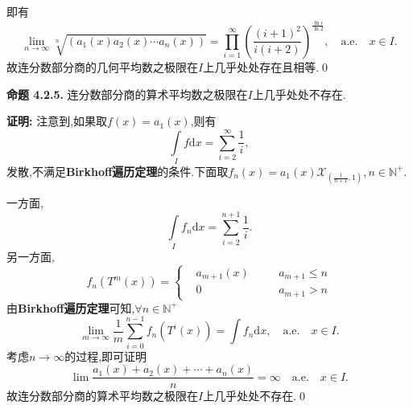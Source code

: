 即有
$$\lim\limits_{n\to\infty}\sqrt[n]{(a_1(x)a_2(x)\cdots a_n(x))}=\prod\limits_{i=1}^\infty\left(\frac{(i+1)^2}{i(i+2)}\right)^{\frac{\ln{i}}{\ln{2}}},\quad\mathrm{a.e.}\quad x\in I.$$
故连分数部分商的几何平均数之极限在$I$上几乎处处存在且相等.\qed
\par
\textbf{命题 4.2.5.  }\textsuperscript{\cite{Ergodic_theory}}
连分数部分商的算术平均数之极限在$I$上几乎处处不存在.
\par
\textbf{证明:  }
注意到,如果取$f(x)=a_1(x)$,则有
$$\int\limits_{I}f\mathrm{d}x=\sum_{i=2}^{\infty}\frac{1}{i},$$发散,不满足\textbf{Birkhoff遍历定理}的条件.下面取$f_n(x)=a_1(x)\mathcal{X}_{(\frac{1}{n+1},1)},n\in\mathbb{N^+}$.\par
一方面,
$$\int\limits_{I}f_n\mathrm{d}x=\sum_{i=2}^{n+1}\frac{1}{i}.$$
另一方面,
$$f_n(T^{m}(x))=\left\{
    \begin{aligned}
         & a_{m+1}(x) \quad &  & a_{m+1}\leqslant n \\
         & 0\quad           &  & a_{m+1}> n
    \end{aligned}
    \right
    .$$
由\textbf{Birkhoff遍历定理}可知,$\forall n\in\mathbb{N^+}$
$$\lim_{m\to\infty}\frac{1}{m}\sum\limits_{i=0}^{n-1}f_n(T^{i}(x))=\int f_n\mathrm{d}x,\quad \mathrm{a.e.}\quad x\in I.$$
考虑$n\to\infty$的过程,即可证明
$$\lim\frac{a_1(x)+a_2(x)+\cdots+a_n(x)}{n}=\infty\quad\mathrm{a.e.}\quad x\in I.$$
故连分数部分商的算术平均数之极限在$I$上几乎处处不存在.\qed
\par
\sectionbreak